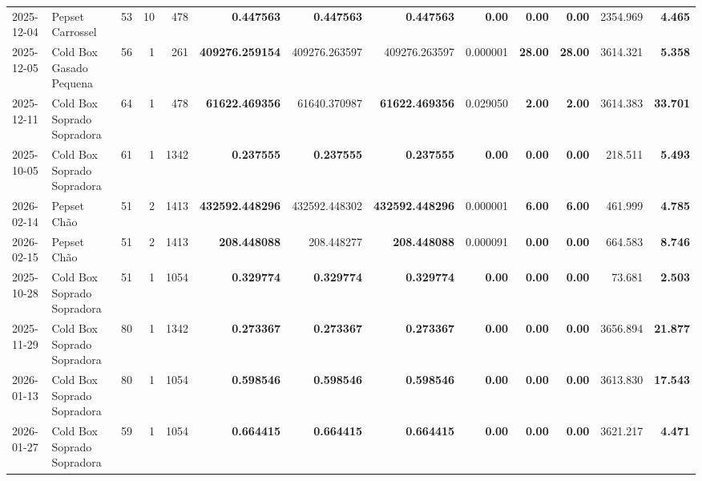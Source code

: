 {\begin{center}
{\begin{tabular}{@{}llrrrrrrrrrrr@{}}
2025-12-04 & Pepset Carrossel & 53 & 10 & 478 & \textbf{0.447563} & \textbf{0.447563} & \textbf{0.447563} & \textbf{0.00} & \textbf{0.00} & \textbf{0.00} & 2354.969 & \textbf{4.465} \\
2025-12-05 & Cold Box Gasado Pequena & 56 & 1 & 261 & \textbf{409276.259154} & 409276.263597 & 409276.263597 & 0.000001 & \textbf{28.00} & \textbf{28.00} & 3614.321 & \textbf{5.358} \\
2025-12-11 & Cold Box Soprado Sopradora & 64 & 1 & 478 & \textbf{61622.469356} & 61640.370987 & \textbf{61622.469356} & 0.029050 & \textbf{2.00} & \textbf{2.00} & 3614.383 & \textbf{33.701} \\
2025-10-05 & Cold Box Soprado Sopradora & 61 & 1 & 1342 & \textbf{0.237555} & \textbf{0.237555} & \textbf{0.237555} & \textbf{0.00} & \textbf{0.00} & \textbf{0.00} & 218.511 & \textbf{5.493} \\
2026-02-14 & Pepset Chão & 51 & 2 & 1413 & \textbf{432592.448296} & 432592.448302 & \textbf{432592.448296} & 0.000001 & \textbf{6.00} & \textbf{6.00} & 461.999 & \textbf{4.785} \\
2026-02-15 & Pepset Chão & 51 & 2 & 1413 & \textbf{208.448088} & 208.448277 & \textbf{208.448088} & 0.000091 & \textbf{0.00} & \textbf{0.00} & 664.583 & \textbf{8.746} \\
2025-10-28 & Cold Box Soprado Sopradora & 51 & 1 & 1054 & \textbf{0.329774} & \textbf{0.329774} & \textbf{0.329774} & \textbf{0.00} & \textbf{0.00} & \textbf{0.00} & 73.681 & \textbf{2.503} \\
2025-11-29 & Cold Box Soprado Sopradora & 80 & 1 & 1342 & \textbf{0.273367} & \textbf{0.273367} & \textbf{0.273367} & \textbf{0.00} & \textbf{0.00} & \textbf{0.00} & 3656.894 & \textbf{21.877} \\
2026-01-13 & Cold Box Soprado Sopradora & 80 & 1 & 1054 & \textbf{0.598546} & \textbf{0.598546} & \textbf{0.598546} & \textbf{0.00} & \textbf{0.00} & \textbf{0.00} & 3613.830 & \textbf{17.543} \\
2026-01-27 & Cold Box Soprado Sopradora & 59 & 1 & 1054 & \textbf{0.664415} & \textbf{0.664415} & \textbf{0.664415} & \textbf{0.00} & \textbf{0.00} & \textbf{0.00} & 3621.217 & \textbf{4.471} \\
\bottomrule
\end{tabular}%
}
\end{center}
}
\vspace*{\fill}
